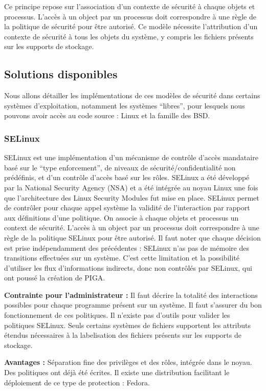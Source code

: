 Ce principe repose sur l'association d'un contexte de sécurité à chaque objets et processus. L'accès à un object par un processus doit correspondre à une règle de la politique de sécurité pour être autorisé. Ce modèle nécessite l'attribution d'un contexte de sécurité à tous les objets du système, y compris les fichiers présents sur les supports de stockage.

\subsection{Solutions disponibles}

Nous allons détailler les implémentations de ces modèles de sécurité dans certains systèmes d'exploitation, notamment les systèmes ``libres'', pour lesquels nous pouvons avoir accès au code source : Linux et la famille des BSD.

\subsubsection{SELinux}

SELinux est une implémentation d'un mécanisme de contrôle d'accès mandataire basé sur le ``type enforcement'', de niveaux de sécurité/confidentialité non prédéfinis, et d'un contrôle d'accès basé sur les rôles. SELinux a été développé par la National Security Agency (NSA) et a été intégrée au noyau Linux une fois que l'architecture des Linux Security Modules fut mise en place. SELinux permet de contrôler pour chaque appel système la validité de l'interaction par rapport aux définitions d'une politique. On associe à chaque objets et processus un context de sécurité. L'accès à un object par un processus doit correspondre à une règle de la politique SELinux pour être autorisé. Il faut noter que chaque décision est prise indépendamment des précédentes : SELinux n'as pas de mémoire des transitions effectuées sur un système. C'est cette limitation et la possibilité d'utiliser les flux d'informations indirects, donc non contrôlés par SELinux, qui ont poussé la création de PIGA.
\begin{list}{}{}
 \item \textbf{Contrainte pour l'administrateur :} Il faut décrire la totalité des interactions possibles pour chaque programme présent sur un système. Il faut s'assurer du bon fonctionnement de ces politiques. Il n'existe pas d'outils pour valider les politiques SELinux. Seuls certains systèmes de fichiers supportent les attributs étendus nécessaires à la labelisation des fichiers présents sur les supports de stockage.
 \item \textbf{Avantages :} Séparation fine des privilèges et des rôles, intégrée dans le noyau. Des politiques ont déjà été écrites. Il existe une distribution facilitant le déploiement de ce type de protection : Fedora.
\end{list}


